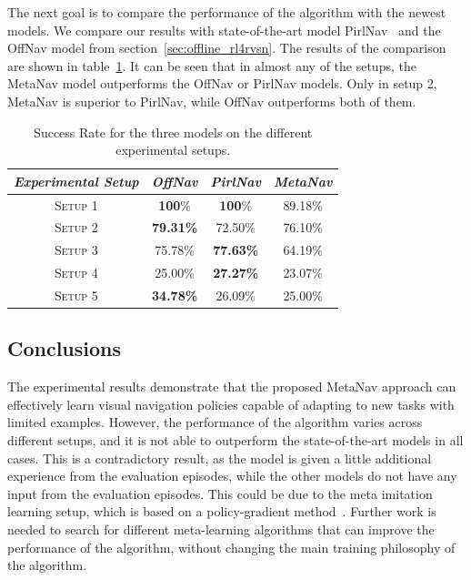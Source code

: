 The next goal is to compare the performance of the algorithm with the newest models.
We compare our results with state-of-the-art model PirlNav~\cite{ramrakhya2023} and the OffNav model from section~\ref{sec:offline_rl4rvsn}.
The results of the comparison are shown in table~\ref{tab:metanav_comparison}.
It can be seen that in almost any of the setups, the MetaNav model outperforms the OffNav or PirlNav models.
Only in setup 2, MetaNav is superior to PirlNav, while OffNav outperforms both of them.

\begin{table}
    \centering
    \begin{tabular}{c|ccc}
        \toprule
        \textit{Experimental Setup} & \textit{OffNav}  & \textit{PirlNav} & \textit{MetaNav} \\
        \midrule
        \textsc{Setup 1}            & \textbf{100}\%   & \textbf{100}\%   & 89.18\%          \\
        \textsc{Setup 2}            & \textbf{79.31\%} & 72.50\%          & 76.10\%          \\
        \textsc{Setup 3}            & 75.78\%          & \textbf{77.63\%} & 64.19\%          \\
        \textsc{Setup 4}            & 25.00\%          & \textbf{27.27\%} & 23.07\%          \\
        \textsc{Setup 5}            & \textbf{34.78\%} & 26.09\%          & 25.00\%          \\
        \bottomrule
    \end{tabular}
    \caption{Success Rate for the three models on the different experimental setups.}
    \label{tab:metanav_comparison}
\end{table}

\subsection{Conclusions}\label{subsec:conclusions_metanav}

The experimental results demonstrate that the proposed MetaNav approach can effectively learn visual navigation policies capable of adapting to new tasks with limited examples.
However, the performance of the algorithm varies across different setups, and it is not able to outperform the state-of-the-art models in all cases.
This is a contradictory result, as the model is given a little additional experience from the evaluation episodes, while the other models do not have any input from the evaluation episodes.
This could be due to the meta imitation learning setup, which is based on a policy-gradient method~\cite{Beck_2025}.
Further work is needed to search for different meta-learning algorithms that can improve the performance of the algorithm, without changing the main training philosophy of the algorithm.


